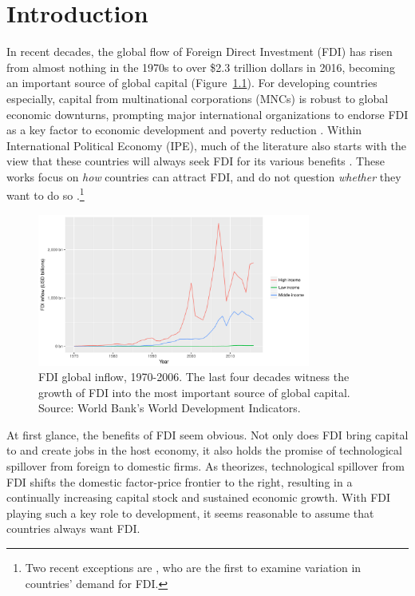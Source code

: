 \chapter{Introduction}
\label{chap:introduction}

In recent decades, the global flow of Foreign Direct Investment (FDI) has risen
from almost nothing in the 1970s to over \$2.3 trillion dollars in 2016,
becoming an important source of global capital (Figure~\ref{fig:globalfdi}). For
developing countries especially, capital from multinational corporations (MNCs)
is robust to global economic downturns, prompting major international
organizations to endorse FDI as a key factor to economic development and poverty
reduction \citep{Mallampally1999, WorldEconomicForum2013}. Within International
Political Economy (IPE), much of the literature also starts with the view that
these countries will always seek FDI for its various benefits
\citep{Jensen2008b}. These works focus on \textit{how} countries can attract
FDI, and do not question \textit{whether} they want to do so \citep{Jensen2003,
  Li2003, Li2006, Ahlquist2006}.\footnote{Two recent exceptions are
  \citet{Pinto2013, Pandya2016}, who are the first to examine variation in
  countries' demand for FDI.}

\begin{figure}[tbp]
  \centering
  \includegraphics[width=0.8\textwidth,keepaspectratio]{../figure/global_fdi}
  \caption[FDI global inflow, 1970-2006.]{FDI global inflow, 1970-2006. The last
    four decades witness the growth of FDI into the most important source of
    global capital. Source: World Bank's World Development Indicators.}
  \label{fig:globalfdi}
\end{figure}

At first glance, the benefits of FDI seem obvious. Not only does FDI bring
capital to and create jobs in the host economy, it also holds the promise of
technological spillover from foreign to domestic firms. As \citet{Findlay1978}
theorizes, technological spillover from FDI shifts the domestic factor-price
frontier to the right, resulting in a continually increasing capital stock and
sustained economic growth. With FDI playing such a key role to development, it
seems reasonable to assume that countries always want FDI.


